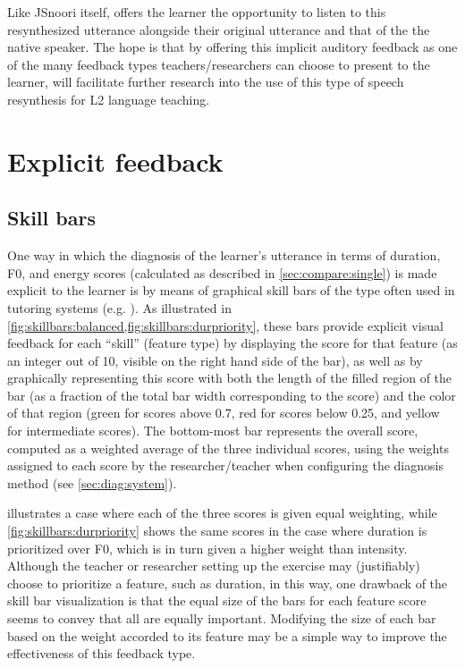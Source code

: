 			Like JSnoori itself,  offers the learner the opportunity to listen to this resynthesized utterance alongside their original utterance and that of the the native speaker. The hope is that by offering this implicit auditory feedback as one of the many feedback types teachers/researchers can choose to present to the learner,  will facilitate further research into the use of this type of speech resynthesis for L2 language teaching.
			
			
	\section{Explicit feedback}
	\label{sec:fb:explicit}
	
		\subsection{Skill bars}
		\label{sec:fb:explicit:skillbars}
		
		
		One way in which 
		the diagnosis of the learner's utterance in terms of duration, F0, and energy scores (calculated as
		described in \cref{sec:compare:single}) is made explicit to the learner is by means of graphical skill bars of the type often used in tutoring systems (e.g. \cite{Long2011,Long2013}).
		As illustrated in \cref{fig:skillbars:balanced,fig:skillbars:durpriority}, these bars provide explicit visual feedback for each ``skill'' (feature type) by displaying the score for that feature (as an integer out of 10, visible on the right hand side of the bar), as well as by graphically representing this score with both the length of the filled region of the bar (as a fraction of the total bar width corresponding to the score) and the color of that region (green for scores above 0.7, red for scores below 0.25, and yellow for intermediate scores).
		 The bottom-most bar represents the overall score, computed as a weighted average of the three individual scores, using the weights assigned to each score by the researcher/teacher when configuring the diagnosis method (see \cref{sec:diag:system}).
		 
		   illustrates a case where each of the three scores is given equal weighting, while \cref{fig:skillbars:durpriority} shows the same scores in the case where duration is prioritized over F0, which is in turn given a higher weight than intensity. Although the teacher or researcher setting up the exercise may (justifiably) choose to prioritize a feature, such as duration, in this way, one drawback of the skill bar visualization is that the equal size of the bars for each feature score seems to convey that all are equally important. Modifying the size of each bar based on the weight accorded to its feature may be a simple way to improve the effectiveness of this feedback type.%
		  
